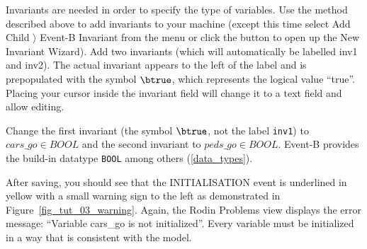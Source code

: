 Invariants are needed in order to specify the type of variables. Use the method described above to add invariants to your machine (except this time select \textsf{Add Child $\rangle$ Event-B Invariant} from the menu or click the  button to open up the New Invariant Wizard). Add two invariants (which will automatically be labelled \textsf{inv1} and \textsf{inv2}). The actual invariant appears to the left of the label and is prepopulated with the symbol $\btrue$, which represents the logical value ``true''. Placing your cursor inside the invariant field will change it to a text field and allow editing. 

Change the first invariant (the symbol $\btrue$, not the label \texttt{inv1}) to $cars\_go \in  BOOL$ and the second invariant to $peds\_go \in  BOOL$.
Event-B provides the build-in datatype \texttt{BOOL} among others (\ref{data_types}).



After saving, you should see that the \textsf{INITIALISATION} event is underlined in yellow with a small warning sign to the left as demonstrated in Figure~\ref{fig_tut_03_warning}. Again, the \textsf{Rodin Problems} view displays the error message: ``Variable cars\_go is not initialized''. Every variable must be initialized in a way that is consistent with the model.

